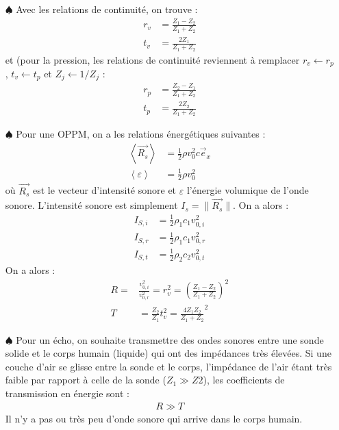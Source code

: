 \documentclass{report}
\begin{document}
\begin{itemize}
	\item[$\spadesuit$] Avec les relations de continuité, on trouve :
	\begin{align*}
	r_v&=\frac{Z_1-Z_2}{Z_1+Z_2}\\
	t_v&=\frac{2Z_1}{Z_1+Z_2}
	\end{align*}
	et (pour la pression, les relations de continuité reviennent à remplacer $r_v\leftarrow r_p$, $t_v\leftarrow t_p$ et $Z_j\leftarrow 1/Z_j$ :
	\begin{align*}
	r_p&=\frac{Z_2-Z_1}{Z_1+Z_2}\\
	t_p&=\frac{2Z_2}{Z_1+Z_2}
	\end{align*}
	
\item[$\spadesuit$] Pour une OPPM, on a les relations énergétiques suivantes :
	\begin{align*}
		\left\langle \vec{R_s} \right\rangle &=\frac{1}{2}\rho v_{0}^2 c \vec{e}_x \\
		\left\langle \varepsilon \right\rangle &= \frac{1}{2}\rho v_{0}^2
	\end{align*}	
	où $\vec{R_s}$ est le vecteur d'intensité sonore et $\varepsilon$ l'énergie volumique de l'onde sonore. 
	L'intensité sonore est simplement $I_s = \|\vec{R_s} \|$. On a alors :
	\begin{align*}
		I_{S,i}&=\frac{1}{2}\rho_1 c_1 v_{0,i}^2 \\
		I_{S,r}&=\frac{1}{2}\rho_1 c_1 v_{0,r}^2 \\
		I_{S,t}&=\frac{1}{2}\rho_2 c_2 v_{0,t}^2 
	\end{align*}
	On a alors :
	\begin{align*}
		R =& \frac{ v_{0,i}^2}{ v_{0,r}^2}=r_v^2=\left( \frac{Z_1-Z_2}{Z_1+Z_2}\right) ^2\\
		T &= \frac{Z_2}{Z_1}t_v^2=\frac{4Z_1Z_2}{Z_1+Z_2}^2
	\end{align*}		
	
	\item[$\spadesuit$] Pour un écho, on souhaite transmettre des ondes sonores entre une sonde solide et le corps humain (liquide) qui ont des impédances très élevées. Si une couche d'air se glisse entre la sonde et le corps, l'impédance de l'air étant très faible par rapport à celle de la sonde ($Z_1\gg Z2$), les coefficients de transmission en énergie sont :
	\begin{align*}
		R \gg T
	\end{align*}
	Il n'y a pas ou très peu d'onde sonore qui arrive dans le corps humain.
		
\end{itemize}
\end{document}
